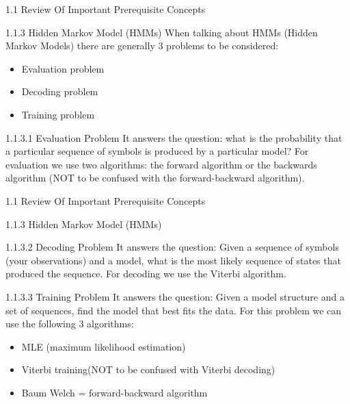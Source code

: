 \documentclass{beamer}
\begin{document}
\begin{frame}{1.1 Review Of Important Prerequisite Concepts}
    \begin{block}{1.1.3 Hidden Markov Model (HMMs)}
    When talking about HMMs (Hidden Markov Models) there are generally 3 problems to be considered:
    \begin{itemize}
        \item Evaluation problem
        \item Decoding problem
        \item Training problem
    \end{itemize}
    
    \begin{block}{1.1.3.1 Evaluation Problem}
    It answers the question: what is the probability that a particular sequence of symbols is produced by a particular model?
For evaluation we use two algorithms: the forward algorithm or the backwards algorithm (NOT to be confused with the forward-backward algorithm).
    \end{block}
    \end{block}
\end{frame}
\begin{frame}{1.1 Review Of Important Prerequisite Concepts}
\begin{block}{1.1.3 Hidden Markov Model (HMMs)}
    \begin{block}{1.1.3.2 Decoding Problem}
    It answers the question: Given a sequence of symbols (your observations) and a model, what is the most likely sequence of states that produced the sequence.
For decoding we use the Viterbi algorithm.
    \end{block}
    \begin{block}{1.1.3.3 Training Problem}
    It answers the question: Given a model structure and a set of sequences, find the model that best fits the data. For this problem we can use the following 3 algorithms:
    \begin{itemize}
        \item MLE (maximum likelihood estimation)
        \item Viterbi training(NOT to be confused with Viterbi decoding)
        \item Baum Welch = forward-backward algorithm
    \end{itemize}
    \end{block}
    \end{block}
\end{frame}
\end{document}

